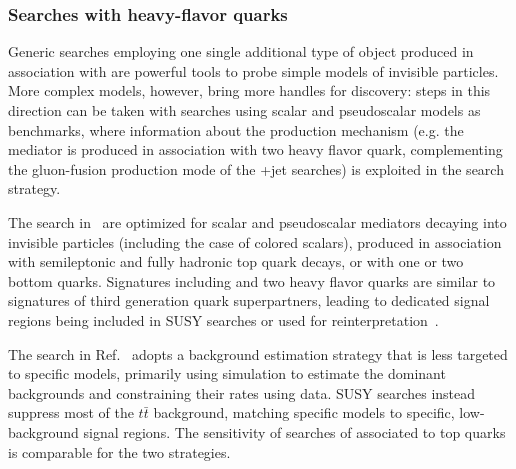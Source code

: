 
\subsubsection{Searches with heavy-flavor quarks}


Generic searches employing one single additional type of object produced in association with \MET are powerful tools to probe simple models of invisible particles. 
More complex models, however, bring more handles for discovery: steps in this direction can be taken with searches using scalar and pseudoscalar models as benchmarks, where information about the production mechanism (e.g. the mediator is produced in association with two heavy flavor quark, complementing the gluon-fusion production mode of the \MET+jet searches) is exploited in 
the search strategy. 

The search in~\cite{Aaboud:2017rzf} are optimized for scalar and pseudoscalar mediators decaying into invisible particles (including the case of colored scalars), produced in association with semileptonic and fully hadronic top quark decays, or with one or two bottom quarks. Signatures including \MET and two heavy flavor quarks are similar to signatures of third generation quark superpartners, leading to dedicated signal regions being included in SUSY searches or used for reinterpretation~\cite{Aaboud:2017aeu,CMS-PAS-SUS-17-001}. 

The search in Ref.~\cite{Aaboud:2017rzf} adopts a background estimation strategy that is less targeted to specific models, primarily using simulation to estimate the dominant backgrounds and constraining their rates using data. SUSY searches instead suppress most of the $t\bar{t}$ background, 
matching specific models to specific, low-background signal regions. The sensitivity of searches of \MET associated to top quarks
is comparable for the two strategies. 

